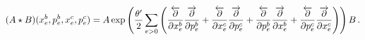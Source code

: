\begin{equation}
(A\star B)(x_{e}^{b},p_{e}^{b},x_{e}^{c},p_{e}^{c})=A\exp \left( {\frac{%
\theta ^{\prime }}{2}}\sum_{e>0}\left( {\frac{\overleftarrow{\partial }}{%
\partial x_{e}^{b}}}{\frac{\overrightarrow{\partial }}{\partial p_{e}^{b}}}+{%
\frac{\overleftarrow{\partial }}{\partial x_{e}^{c}}}{\frac{\overrightarrow{%
\partial }}{\partial p_{e}^{c}}}+{\frac{\overleftarrow{\partial }}{\partial
p_{e}^{b}}}{\frac{\overrightarrow{\partial }}{\partial x_{e}^{b}}}+{\frac{%
\overleftarrow{\partial }}{\partial p_{e}^{c}}}{\frac{\overrightarrow{%
\partial }}{\partial x_{e}^{c}}}\right) \right) B\,.  \label{e_M2}
\end{equation}

